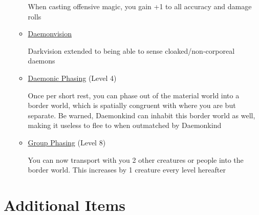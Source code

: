 \documentclass[12pt, landscape]{article}
\begin{document}
\begin{FlushLeft}
\begin{multicols}{2}
\begin{itemize}
\begin{itemize}
					When casting offensive magic, you gain +1 to all accuracy and damage rolls

					\item \underline{Daemonvision}

					Darkvision extended to being able to sense cloaked/non-corporeal daemons

					\item \underline{Daemonic Phasing} (Level 4)

					Once per short rest, you can phase out of the material world into a border world, which is spatially congruent with where you are but separate. Be warned, Daemonkind can inhabit this border world as well, making it useless to flee to when outmatched by Daemonkind

					\item \underline{Group Phasing} (Level 8)

					You can now transport with you 2 other creatures or people into the border world. This increases by 1 creature every level hereafter
				\end{itemize}
			\end{itemize}
			\vfill \pagebreak

			\section{Additional Items}
		\end{multicols}
	\end{FlushLeft}
\end{document}
